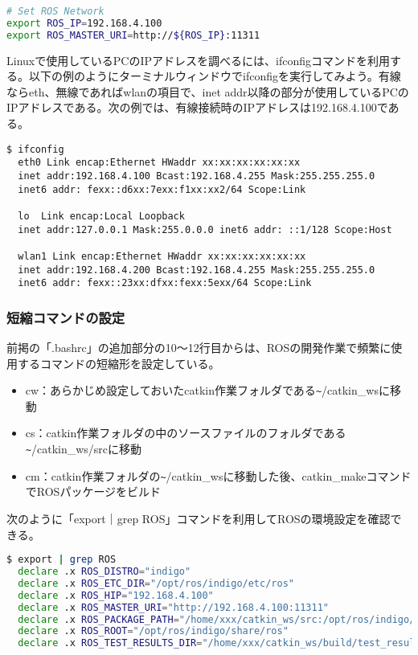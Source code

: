 \begin{lstlisting}[language=bash]
# Set ROS Network
export ROS_IP=192.168.4.100
export ROS_MASTER_URI=http://${ROS_IP}:11311
\end{lstlisting}

\begin{exercise}[ifconfig]
  Linuxで使用しているPCのIPアドレスを調べるには、ifconfigコマンドを利用する。以下の例のようにターミナルウィンドウでifconfigを実行してみよう。有線ならeth、無線であればwlanの項目で、inet addr以降の部分が使用しているPCのIPアドレスである。次の例では、有線接続時のIPアドレスは192.168.4.100である。
  \begin{lstlisting}[language=ROS, backgroundcolor=\color{ocre!10}, numbers=none]
  $ ifconfig
  eth0 Link encap:Ethernet HWaddr xx:xx:xx:xx:xx:xx
  inet addr:192.168.4.100 Bcast:192.168.4.255 Mask:255.255.255.0
  inet6 addr: fexx::d6xx:7exx:f1xx:xx2/64 Scope:Link

  lo  Link encap:Local Loopback
  inet addr:127.0.0.1 Mask:255.0.0.0 inet6 addr: ::1/128 Scope:Host

  wlan1 Link encap:Ethernet HWaddr xx:xx:xx:xx:xx:xx
  inet addr:192.168.4.200 Bcast:192.168.4.255 Mask:255.255.255.0
  inet6 addr: fexx::23xx:dfxx:fexx:5exx/64 Scope:Link
  \end{lstlisting}
\end{exercise}

\subsubsection{短縮コマンドの設定}

前掲の「.bashrc」の追加部分の10～12行目からは、ROSの開発作業で頻繁に使用するコマンドの短縮形を設定している。

\begin{itemize}[leftmargin=*]
\item cw：あらかじめ設定しておいたcatkin作業フォルダである\verb|~|/catkin\_wsに移動
\item cs：catkin作業フォルダの中のソースファイルのフォルダである\verb|~|/catkin\_ws/srcに移動
\item cm：catkin作業フォルダの\verb|~|/catkin\_wsに移動した後、catkin\_makeコマンドでROSパッケージをビルド
\end{itemize}

\begin{exercise}[ROSの環境設定を確認する方法]
  次のように「export｜grep ROS」コマンドを利用してROSの環境設定を確認できる。

  \begin{lstlisting}[language=bash]
  $ export | grep ROS
  declare .x ROS_DISTRO="indigo"
  declare .x ROS_ETC_DIR="/opt/ros/indigo/etc/ros"
  declare .x ROS_HIP="192.168.4.100"
  declare .x ROS_MASTER_URI="http://192.168.4.100:11311"
  declare .x ROS_PACKAGE_PATH="/home/xxx/catkin_ws/src:/opt/ros/indigo/share:/opt/ros/indigo/ stacks"
  declare .x ROS_ROOT="/opt/ros/indigo/share/ros"
  declare .x ROS_TEST_RESULTS_DIR="/home/xxx/catkin_ws/build/test_results"
  \end{lstlisting}
\end{exercise}


